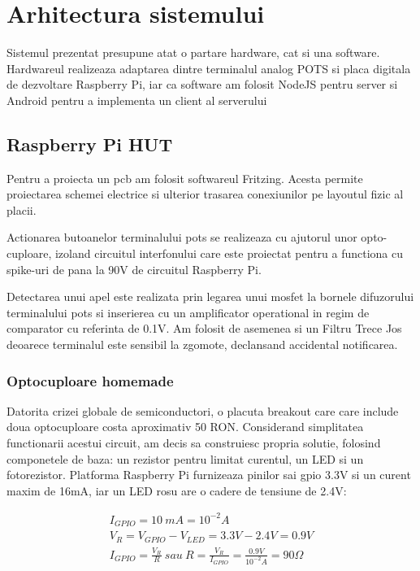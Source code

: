 \section {Arhitectura sistemului}

Sistemul prezentat presupune atat o partare hardware, cat si una software. Hardwareul realizeaza adaptarea dintre terminalul analog POTS si placa digitala de dezvoltare Raspberry Pi, iar ca software am folosit NodeJS pentru server si Android pentru a implementa un client al serverului

\subsection {Raspberry Pi HUT}

Pentru a proiecta un \acrfull{pcb} am folosit softwareul Fritzing. Acesta permite proiectarea schemei electrice si ulterior trasarea conexiunilor pe layoutul fizic al placii.

Actionarea butoanelor terminalului \acrshort{pots} se realizeaza cu ajutorul unor opto-cuploare, izoland circuitul interfonului care este proiectat pentru a functiona cu spike-uri de pana la 90V de circuitul Raspberry Pi.

Detectarea unui apel este realizata prin legarea unui \acrfull{mosfet} la bornele difuzorului terminalului \acrshort{pots} si inserierea cu un amplificator operational in regim de comparator cu referinta de 0.1V. Am folosit de asemenea si un Filtru Trece Jos deoarece terminalul este sensibil la zgomote, declansand accidental notificarea.

\subsubsection {Optocuploare homemade}

Datorita crizei globale de semiconductori, o placuta breakout care care include doua optocuploare costa aproximativ 50 RON. Considerand simplitatea functionarii acestui circuit, am decis sa construiesc propria solutie, folosind componetele de baza: un rezistor pentru limitat curentul, un LED si un fotorezistor. Platforma Raspberry Pi furnizeaza pinilor sai \acrshort{gpio} 3.3V si un curent maxim de 16mA, iar un LED rosu are o cadere de tensiune de 2.4V:

\begin{center}
\begin{gather*}
I_{GPIO} =10\ mA=10^{-2} A\\
V_{R} =V_{GPIO} -V_{LED} =3.3V-2.4V=0.9V\\
I_{GPIO} =\frac{V_{R}}{R} \ sau\ R=\frac{V_{R}}{I_{GPIO}} =\frac{0.9V}{10^{-2}A} =90\Omega
\end{gather*}
\end{center}

